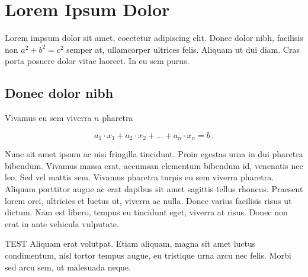 

\setcounter{chapter}{0} 

\chapter{Lorem Ipsum Dolor} \label{mychapter}

Lorem impsum dolor sit amet, coectetur adipiscing elit. Donec dolor nibh, facilisis non $a^2 + b^2 = c^2$ semper at, ullamcorper ultrices felis. Aliquam ut dui diam. Cras porta posuere dolor vitae laoreet. In eu sem purus. 

\section{Donec dolor nibh}
\label{myfirstsection}

Vivamus  eu sem viverra $n$ pharetra

\begin{equation} \label{myeq.1}
a_1\cdot x_1+a_2\cdot x_2+...+a_n\cdot x_n=b\,.
\end{equation}


Nunc sit amet ipsum ac nisi fringilla tincidunt. Proin egestas urna in dui pharetra bibendum. Vivamus massa erat, accumsan elementum bibendum id, venenatis nec leo. Sed vel mattis sem. Vivamus pharetra turpis eu sem viverra pharetra. Aliquam porttitor augue ac erat dapibus sit amet sagittis tellus rhoncus. Praesent lorem orci, ultricies et luctus ut, viverra ac nulla. Donec varius facilisis risus ut dictum. Nam est libero, tempus eu tincidunt eget, viverra at risus. Donec non erat in ante vehicula vulputate.

TEST Aliquam erat volutpat. Etiam aliquam, magna sit amet luctus condimentum, nisl tortor tempus augue, eu tristique urna arcu nec felis. Morbi sed arcu sem, ut malesuada neque.

